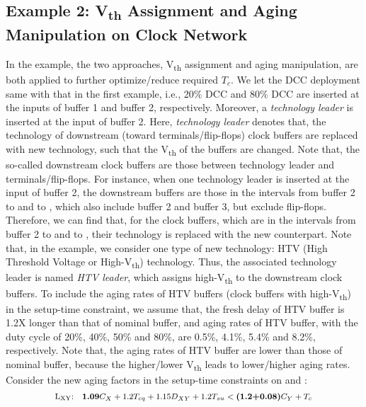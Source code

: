 \subsection{Example 2: V\textsubscript{th} Assignment and Aging Manipulation on Clock Network}
\label{sec:motivate:exp2}
In the example, the two approaches, V\textsubscript{th} assignment and aging manipulation, are both applied to further optimize/reduce required $T_c$. We let the DCC deployment same with that in the first example, i.e., 20\% DCC and 80\% DCC are inserted at the inputs of buffer 1 and buffer 2, respectively. Moreover, a \textit{technology leader} is inserted at the input of buffer 2. Here, \textit{technology leader} denotes that, the technology of downstream (toward terminals/flip-flops) clock buffers are replaced with new technology, such that the V\textsubscript{th} of the buffers are changed. Note that, the so-called downstream clock buffers are those between technology leader and terminals/flip-flops. For instance, when one technology leader is inserted at the input of buffer 2, the downstream buffers are those in the intervals from buffer 2 to  and  to , which also include buffer 2 and buffer 3, but exclude flip-flops. Therefore, we can find that, for the clock buffers, which are in the intervals from buffer 2 to  and  to , their technology is replaced with the new counterpart. Note that, in the example, we consider one type of new technology: HTV (High Threshold Voltage or High-V\textsubscript{th}) technology. Thus, the associated technology leader is named \textit{HTV leader}, which assigns high-V\textsubscript{th} to the downstream clock buffers. To include the aging rates of HTV buffers (clock buffers with high-V\textsubscript{th}) in the setup-time constraint, we assume that, the fresh delay of HTV buffer is 1.2X longer than that of nominal buffer, and aging rates of HTV buffer, with the duty cycle of 20\%, 40\%, 50\% and 80\%, are 0.5\%, 4.1\%, 5.4\% and 8.2\%, respectively. Note that, the aging rates of HTV buffer are lower than those of nominal buffer, because the higher/lower V\textsubscript{th} leads to lower/higher aging rates. Consider the new aging factors in the setup-time constraints on  and :
\begin{equation}
	\mbox{\fontsize{8}{9.6}\selectfont \ce{L_{XY}}:\quad$\textbf{1.09}C_X+1.2T_{cq}+1.15D_{XY}+1.2T_{su}<\textbf{(1.2+0.08)}C_Y+T_c$} 
	\label{eq:lxy2}
\end{equation}
